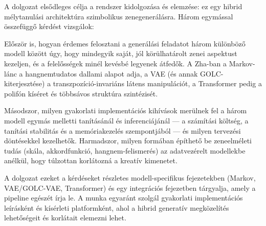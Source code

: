 A dolgozat elsődleges célja a rendszer kidolgozása és elemzése: ez egy hibrid mélytanulási architektúra szimbolikus zenegenerálásra. Három egymással összefüggő kérdést vizsgálok:

Először is, hogyan érdemes felosztani a generálási feladatot három különböző modell között úgy, hogy mindegyik saját, jól körülhatárolt zenei aspektust kezeljen, és a felelősségek minél kevésbé legyenek átfedők. A Zha-ban a Markov-lánc a hangnemtudatos dallami alapot adja, a VAE (és annak GOLC-kiterjesztése) a transzpozíció-invariáns látens manipulációt, a Transformer pedig a polifón kíséret és többsávos struktúra szintézisét.

Másodszor, milyen gyakorlati implementációs kihívások merülnek fel a három modell egymás melletti tanításánál és inferenciájánál --- a számítási költség, a tanítási stabilitás és a memóriakezelés szempontjából --- és milyen tervezési döntésekkel kezelhetők. Harmadszor, milyen formában építhető be zeneelméleti tudás (skála, akkordfunkció, hangnem-felismerés) az adatvezérelt modellekbe anélkül, hogy túlzottan korlátozná a kreatív kimenetet.

A dolgozat ezeket a kérdéseket részletes modell-specifikus fejezetekben (Markov, VAE/GOLC-VAE, Transformer) és egy integrációs fejezetben tárgyalja, amely a pipeline egészét írja le. A munka egyaránt szolgál gyakorlati implementációs leírásként és kísérleti platformként, ahol a hibrid generatív megközelítés lehetőségeit és korlátait elemezni lehet.